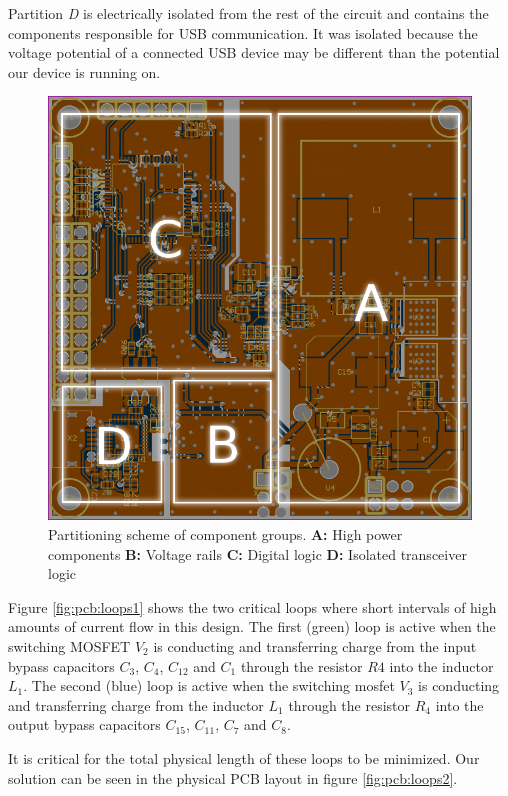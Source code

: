 Partition \emph{D} is  electrically  isolated  from  the rest of the circuit and
contains  the  components responsible for USB  communication.  It  was  isolated
because the  voltage  potential  of a connected USB device may be different than
the potential our device is running on.

\begin{figure}[th!]
    \centering
    \includegraphics[width=.45\linewidth]{images/pcb/partitioning.png}
    \caption{Partitioning scheme of component groups.
        \textbf{A:} High power components
        \textbf{B:} Voltage rails
        \textbf{C:} Digital logic
        \textbf{D:} Isolated transceiver logic
    }
    \label{fig:pcb:partitioning}
\end{figure}

Figure \ref{fig:pcb:loops1} shows the two critical loops  where  short intervals
of high amounts of current flow in this design. The first (green) loop is active
when the switching  MOSFET  $V_2$ is conducting and transferring charge from the
input bypass capacitors $C_3$, $C_4$, $C_{12}$ and  $C_1$  through  the resistor
$R4$  into  the  inductor  $L_1$.  The  second  (blue) loop is active  when  the
switching mosfet $V_3$ is conducting and transferring  charge  from the inductor
$L_1$ through the resistor $R_4$  into  the  output  bypass capacitors $C_{15}$,
$C_{11}$, $C_7$ and $C_8$.

It is critical for the total physical length of these loops to be minimized. Our
solution can be seen in the physical PCB  layout in figure \ref{fig:pcb:loops2}.

